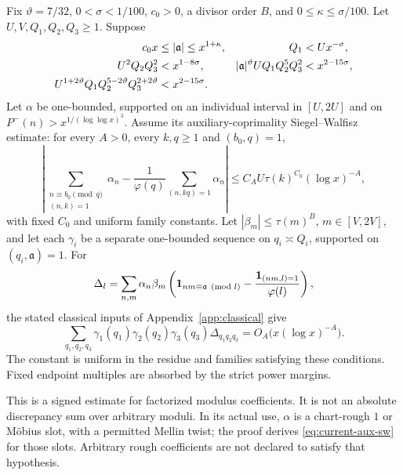 \begin{proposition}
\label{prop:current-medium}
Fix $\vartheta=7/32$, $0<\sigma<1/100$, $c_0>0$, a divisor order
$B$, and $0\le\kappa\le\sigma/100$. Let $U,V,Q_1,Q_2,Q_3\ge1$. Suppose
\begin{align}
 c_0x&\le |\mathfrak a|\le x^{1+\kappa},&
 Q_1&<Ux^{-\sigma}, \notag\\
 U^2Q_2Q_3^2&<x^{1-8\sigma},&
 |\mathfrak a|^{\vartheta}UQ_1Q_2^5Q_3^2&<x^{2-15\sigma},
       \label{eq:current-medium-ranges}\\
 U^{1+2\vartheta}Q_1Q_2^{5-2\vartheta}Q_3^{2+2\vartheta}
      &<x^{2-15\sigma}.&&\notag
\end{align}
Let $\alpha$ be one-bounded, supported on an individual interval in
$[U,2U]$ and on
$P^-(n)>x^{1/(\log\log x)^3}$.  Assume its auxiliary-coprimality
Siegel--Walfisz estimate: for every $A>0$, every $k,q\ge1$ and
$(b_0,q)=1$,
\begin{equation}
 \left|\sum_{\substack{n\equiv b_0\pmod q\\(n,k)=1}}\alpha_n
 -\frac1{\varphi(q)}\sum_{(n,kq)=1}\alpha_n\right|
 \le C_AU\tau(k)^{C_0}(\log x)^{-A},
 \label{eq:current-aux-sw}
\end{equation}
with fixed $C_0$ and uniform family constants.  Let
$|\beta_m|\le\tau(m)^B$, $m\in[V,2V]$, and let each $\gamma_i$ be a
separate one-bounded sequence on $q_i\asymp Q_i$, supported on
$(q_i,\mathfrak a)=1$.  For
\[
 \Delta_l=\sum_{n,m}\alpha_n\beta_m
 \left({\bf1}_{nm\equiv\mathfrak a\pmod l}
       -\frac{{\bf1}_{(nm,l)=1}}{\varphi(l)}\right),
\]
the stated classical inputs of Appendix~\ref{app:classical} give
\begin{equation}
 \sum_{q_1,q_2,q_3}\gamma_1(q_1)\gamma_2(q_2)\gamma_3(q_3)
                    \Delta_{q_1q_2q_3}
       =O_A\bigl(x(\log x)^{-A}\bigr).
 \label{eq:current-medium-conclusion}
\end{equation}
The constant is uniform in the residue and families satisfying these
conditions.  Fixed endpoint multiples are absorbed by the strict
power margins.
\end{proposition}

This is a signed estimate for factorized modulus coefficients.  It is
not an absolute discrepancy sum over arbitrary moduli.  In its actual
use, $\alpha$ is a chart-rough $1$ or M\"obius slot, with a permitted
Mellin twist; the proof derives \eqref{eq:current-aux-sw} for those
slots.  Arbitrary rough coefficients are not declared to satisfy that
hypothesis.

